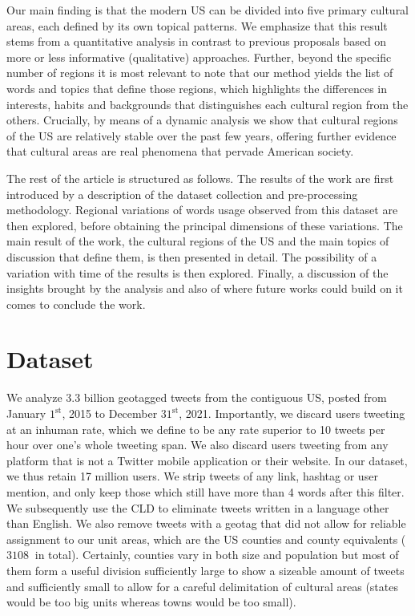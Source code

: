 \documentclass[../thesis.tex]{subfiles}
\begin{document}
Our main finding is that the modern US can be divided into five primary cultural areas,
each defined by its own topical patterns. We emphasize that this result stems from a
quantitative analysis in contrast to previous proposals based on more or less
informative (qualitative) approaches. Further, beyond the specific number of regions it
is most relevant to note that our method yields the list of words and topics that define
those regions, which highlights the differences in interests, habits and backgrounds
that distinguishes each cultural region from the others. Crucially, by means of a
dynamic analysis we show that cultural regions of the US are relatively stable over the
past few years, offering further evidence that cultural areas are real phenomena that
pervade American society.

The rest of the article is structured as follows. The results of the work are first
introduced by a description of the dataset collection and pre-processing methodology.
Regional variations of words usage observed from this dataset are then explored, before
obtaining the principal dimensions of these variations. The main result of the work, the
cultural regions of the US and the main topics of discussion that define them, is then
presented in detail. The possibility of a variation with time of the results is then
explored. Finally, a discussion of the insights brought by the analysis and also of
where future works could build on it comes to conclude the work.



\section{Dataset}

We analyze 3.3 billion geotagged tweets from the contiguous US, posted from January
$1^\text{st}$, 2015 to December $31^\text{st}$, 2021. Importantly, we discard users
tweeting at an inhuman rate, which we define to be any rate superior to 10 tweets per
hour over one's whole tweeting span. We also discard users tweeting from any platform
that is not a Twitter mobile application or their website. In our dataset, we thus
retain 17 million users. We strip tweets of any link, hashtag or user mention, and only
keep those which still have more than 4 words after this filter. We subsequently use the
\ac{CLD} to eliminate tweets written in a language other than English. We also remove
tweets with a geotag that did not allow for reliable assignment to our unit areas, which
are the US counties and county equivalents ($\SI{3108}{}$ in total). Certainly, counties
vary in both size and population but most of them form a useful division sufficiently
large to show a sizeable amount of tweets and sufficiently small to allow for a careful
delimitation of cultural areas (states would be too big units whereas towns would be too
small).
\end{document}
